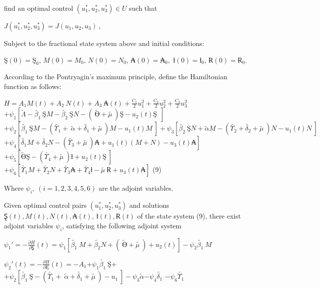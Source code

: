 \documentclass[10pt]{NSP1}
\begin{document}
find an optimal control \((u_{1}^{*},u_{2}^{*},u_{3}^{*}) \in U\) such that

\(J\left( u_{1}^{*},u_{2}^{*},u_{3}^{*} \right) = J\left( u_{1},u_{2},u_{3} \right)\ ,\)

Subject to the fractional state system above and initial conditions:

\(Ş(0) = Ş_{0}\), \(M(0) = M_{0}\), \(N(0) = N_{0}\), \(₳(0) = ₳_{0},\) \(ƚ(0) = ƚ_{0}\), \(Ɍ(0) = Ɍ_{0}\).

According to the Pontryagin’s maximum principle, define the Hamiltonian function as follows:

\(H = A_{1}M(t) + A_{2}\ N(t) + A_{3}\ ₳(t) + \frac{C_{1}}{2}u_{1}^{2} + \frac{C_{2}}{2}u_{2}^{2} + \frac{C_{3}}{2}u_{3}^{2}\) \(+ \psi_{1}\left\lbrack \widetilde{\Lambda} - \widetilde{\beta_{1}}\ ŞM - \widetilde{\beta_{2}}\ ŞN - \left( \ \widetilde{Ө} + \widetilde{\mu\ } \right)Ş - u_{2}(t)Ş\ \ \right\rbrack\) \(+ \psi_{2}\left\lbrack \widetilde{\beta_{1}}\ ŞM - \left( \widetilde{\Upsilon_{1}} + \ \widetilde{\alpha} + \widetilde{\delta_{1}} + \widetilde{\mu\ } \right)M - u_{1}(t)M\ \right\rbrack + \psi_{3}\left\lbrack \widetilde{\beta_{2}}\ ŞN + \widetilde{\alpha}M - \left( \widetilde{\Upsilon_{2}} + \widetilde{\delta_{2}} + \widetilde{\mu\ } \right)N - u_{1}(t)N\ \right\rbrack\) \(+ \psi_{4}\left\lbrack \widetilde{\delta_{1}}M + \widetilde{\delta_{2}}N - \left( \widetilde{\Upsilon_{3}} + \widetilde{\mu\ } \right)₳ + u_{1}(t)(M + N) - u_{3}(t)₳ \right\rbrack\) \(+ \psi_{5}\left\lbrack \widetilde{Ө}Ş - \left( \widetilde{\Upsilon_{4}} + \widetilde{\mu\ } \right)ƚ + u_{2}(t)Ş\ \right\rbrack\) \(+ \psi_{6}\left\lbrack \widetilde{\Upsilon_{1}}M + \widetilde{\Upsilon_{2}}N + \widetilde{\Upsilon_{3}}₳ + \widetilde{\Upsilon_{4}}ƚ - \widetilde{\mu\ }Ɍ + u_{3}(t)₳ \right\rbrack\) (9)

Where \(\psi_{i},\ (i = 1,2,3,4,5,6)\) are the adjoint variables.

Given optimal control pairs \(\left( u_{1}^{*},u_{2}^{*},u_{3}^{*} \right)\) and solutions \(Ȿ(t),M(t),N(t),₳(t),\ ƚ(t),Ɍ(t)\) of the state system (9), there exist adjoint variables \(\psi_{i}\), satisfying the following adjoint system

\(\psi_{1}' = - \frac{\partial H}{\partial Ȿ}(t) = \psi_{1}\left\lbrack \widetilde{\beta_{1}}\ M + \widetilde{\beta_{2}}N + \left( \ \widetilde{Ө} + \widetilde{\mu\ } \right) + u_{2}(t) \right\rbrack - \psi_{2}\widetilde{\beta_{1}}\ M\)

\(\psi_{2}'(t) = - \frac{\partial H}{\partial Ę}(t) = - A_{1}\)+\(\psi_{1}\widetilde{\beta_{1}}\ Ş\)+\(+ \psi_{2}\left\lbrack \widetilde{\beta_{1}}\ Ş - \left( \widetilde{\Upsilon_{1}} + \ \widetilde{\alpha} + \widetilde{\delta_{1}} + \widetilde{\mu\ } \right) - u_{1}\ \right\rbrack - \psi_{3}\widetilde{\alpha}{- \psi}_{4}\widetilde{\delta_{1}}\) \(- \psi_{6}\widetilde{\Upsilon_{1}}\)
\end{document}
